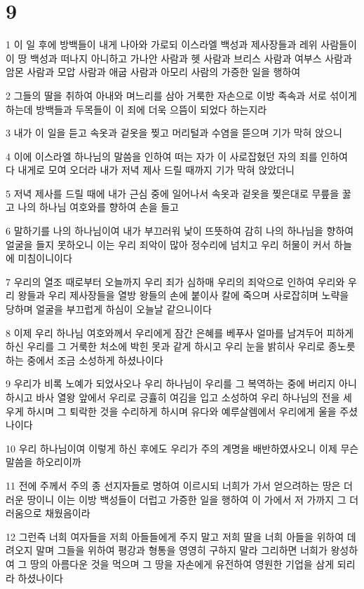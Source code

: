\chapter{9}

\par 1 이 일 후에 방백들이 내게 나아와 가로되 이스라엘 백성과 제사장들과 레위 사람들이 이 땅 백성과 떠나지 아니하고 가나안 사람과 헷 사람과 브리스 사람과 여부스 사람과 암몬 사람과 모압 사람과 애굽 사람과 아모리 사람의 가증한 일을 행하여
\par 2 그들의 딸을 취하여 아내와 며느리를 삼아 거룩한 자손으로 이방 족속과 서로 섞이게 하는데 방백들과 두목들이 이 죄에 더욱 으뜸이 되었다 하는지라
\par 3 내가 이 일을 듣고 속옷과 겉옷을 찢고 머리털과 수염을 뜯으며 기가 막혀 앉으니
\par 4 이에 이스라엘 하나님의 말씀을 인하여 떠는 자가 이 사로잡혔던 자의 죄를 인하여 다 내게로 모여 오더라 내가 저녁 제사 드릴 때까지 기가 막혀 앉았더니
\par 5 저녁 제사를 드릴 때에 내가 근심 중에 일어나서 속옷과 겉옷을 찢은대로 무릎을 꿇고 나의 하나님 여호와를 향하여 손을 들고
\par 6 말하기를 나의 하나님이여 내가 부끄러워 낯이 뜨뜻하여 감히 나의 하나님을 향하여 얼굴을 들지 못하오니 이는 우리 죄악이 많아 정수리에 넘치고 우리 허물이 커서 하늘에 미침이니이다
\par 7 우리의 열조 때로부터 오늘까지 우리 죄가 심하매 우리의 죄악으로 인하여 우리와 우리 왕들과 우리 제사장들을 열방 왕들의 손에 붙이사 칼에 죽으며 사로잡히며 노략을 당하며 얼굴을 부끄럽게 하심이 오늘날 같으니이다
\par 8 이제 우리 하나님 여호와께서 우리에게 잠간 은혜를 베푸사 얼마를 남겨두어 피하게 하신 우리를 그 거룩한 처소에 박힌 못과 같게 하시고 우리 눈을 밝히사 우리로 종노릇 하는 중에서 조금 소성하게 하셨나이다
\par 9 우리가 비록 노예가 되었사오나 우리 하나님이 우리를 그 복역하는 중에 버리지 아니하시고 바사 열왕 앞에서 우리로 긍휼히 여김을 입고 소성하여 우리 하나님의 전을 세우게 하시며 그 퇴락한 것을 수리하게 하시며 유다와 예루살렘에서 우리에게 울을 주셨나이다
\par 10 우리 하나님이여 이렇게 하신 후에도 우리가 주의 계명을 배반하였사오니 이제 무슨 말씀을 하오리이까
\par 11 전에 주께서 주의 종 선지자들로 명하여 이르시되 너희가 가서 얻으려하는 땅은 더러운 땅이니 이는 이방 백성들이 더럽고 가증한 일을 행하여 이 가에서 저 가까지 그 더러움으로 채웠음이라
\par 12 그런즉 너희 여자들을 저희 아들들에게 주지 말고 저희 딸을 너희 아들을 위하여 데려오지 말며 그들을 위하여 평강과 형통을 영영히 구하지 말라 그리하면 너희가 왕성하여 그 땅의 아름다운 것을 먹으며 그 땅을 자손에게 유전하여 영원한 기업을 삼게 되리라 하셨나이다
